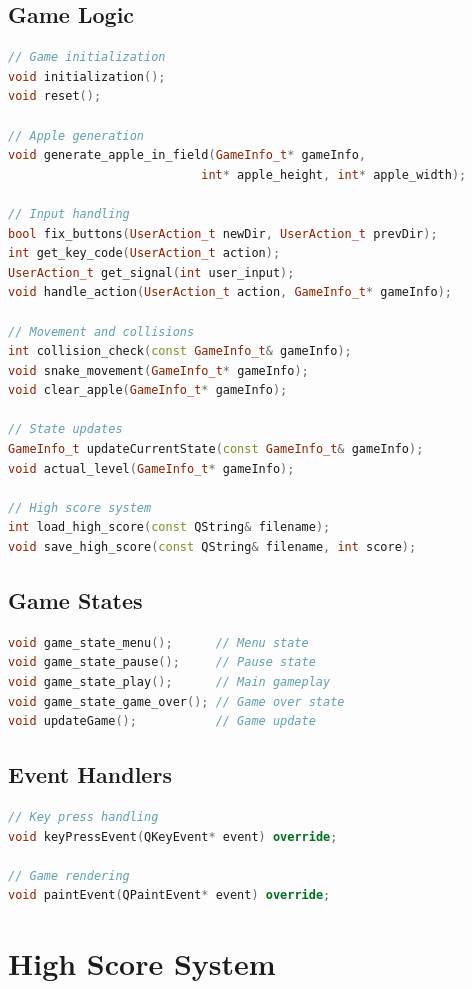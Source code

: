 \documentclass[12pt,a4paper]{article}
\begin{document}
\subsection{Game Logic}
\begin{lstlisting}[language=C++,caption=Game logic functions]
// Game initialization
void initialization();
void reset();

// Apple generation
void generate_apple_in_field(GameInfo_t* gameInfo, 
                           int* apple_height, int* apple_width);

// Input handling
bool fix_buttons(UserAction_t newDir, UserAction_t prevDir);
int get_key_code(UserAction_t action);
UserAction_t get_signal(int user_input);
void handle_action(UserAction_t action, GameInfo_t* gameInfo);

// Movement and collisions
int collision_check(const GameInfo_t& gameInfo);
void snake_movement(GameInfo_t* gameInfo);
void clear_apple(GameInfo_t* gameInfo);

// State updates
GameInfo_t updateCurrentState(const GameInfo_t& gameInfo);
void actual_level(GameInfo_t* gameInfo);

// High score system
int load_high_score(const QString& filename);
void save_high_score(const QString& filename, int score);
\end{lstlisting}

\subsection{Game States}
\begin{lstlisting}[language=C++,caption=Game state functions]
void game_state_menu();      // Menu state
void game_state_pause();     // Pause state
void game_state_play();      // Main gameplay
void game_state_game_over(); // Game over state
void updateGame();           // Game update
\end{lstlisting}

\subsection{Event Handlers}
\begin{lstlisting}[language=C++,caption=Event handlers]
// Key press handling
void keyPressEvent(QKeyEvent* event) override;

// Game rendering
void paintEvent(QPaintEvent* event) override;
\end{lstlisting}

\section{High Score System}
\end{document}
